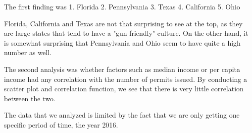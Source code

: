 \documentclass[11pt]{article}
\begin{document}
The first finding was 1. Florida 2. Pennsylvania 3. Texas 4. California
5. Ohio

Florida, California and Texas are not that surprising to see at the top,
as they are large states that tend to have a "gun-friendly" culture. On
the other hand, it is somewhat surprising that Pennsylvania and Ohio
seem to have quite a high number as well.

The second analysis was whether factors such as median income or per
capita income had any correlation with the number of permits issued. By
conducting a scatter plot and correlation function, we see that there is
very little correlation between the two.

    The data that we analyzed is limited by the fact that we are only
getting one specific period of time, the year 2016.


    
    
    
    
\end{document}
